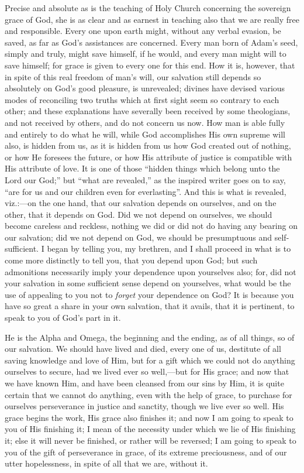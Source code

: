 Precise and absolute as is the teaching of Holy Church concerning
the sovereign grace of God, she is as clear and as earnest in teaching
also that we are really free and responsible. Every one upon earth
might, without any verbal evasion, be saved, as far as God's
assistances are concerned. Every man born of Adam's seed, simply and
truly, might save himself, if he would, and every man might will to
save himself; for grace is given to every one for this end. How it is,
however, that in spite of this real freedom of man's will, our
salvation still depends so absolutely on God's good pleasure, is
unrevealed; divines have devised various modes of reconciling two
truths which at first sight seem so contrary to each other; and these
explanations have severally been received by some theologians, and not
received by others, and do not concern us now. How man is able fully
and entirely to do what he will, while God accomplishes His own
supreme will also, is hidden from us, as it is hidden from us how God
created out of nothing, or how He foresees the future, or how His
attribute of justice is compatible with His attribute of love. It is
one of those ``hidden things which belong unto the Lord our
God;'' but ``what are revealed,'' as the inspired writer
goes on to say, ``are for us and our children even for
everlasting''. And this is what is revealed, viz.:—on the one
hand, that our salvation depends on ourselves, and on the other, that
it depends on God. Did we not depend on ourselves, we should become
careless and reckless, nothing we did or did not do having any bearing
on our salvation; did we not depend on God, we should be presumptuous
and self-sufficient. I began by telling you, my brethren, and I shall
proceed in what is to come more distinctly to tell you, that you
depend upon God; but such admonitions necessarily imply your
dependence upon yourselves also; for, did not your salvation in some
sufficient sense depend on yourselves, what would be the use of
appealing to you not to \emph{forget} your dependence on God? It is
because you have so great a share in your own salvation, that it
avails, that it is pertinent, to speak to you of God's part in it.

He is the Alpha and Omega, the beginning and the ending, as of all
things, so of our salvation. We should have lived and died, every one
of us, destitute of all saving knowledge and love of Him, but for a
gift which we could not do anything ourselves to secure, had we lived
ever so well,—but for His grace; and now that we have known Him, and
have been cleansed from our sins by Him, it is quite certain that we
cannot do anything, even with the help of grace, to purchase for
ourselves perseverance in justice and sanctity, though we live ever so
well. His grace begins the work, His grace also finishes it; and now I
am going to speak to you of His finishing it; I mean of the necessity
under which we lie of His finishing it; else it will never be
finished, or rather will be reversed; I am going to speak to you of
the gift of perseverance in grace, of its extreme preciousness, and of
our utter hopelessness, in spite of all that we are, without it.

